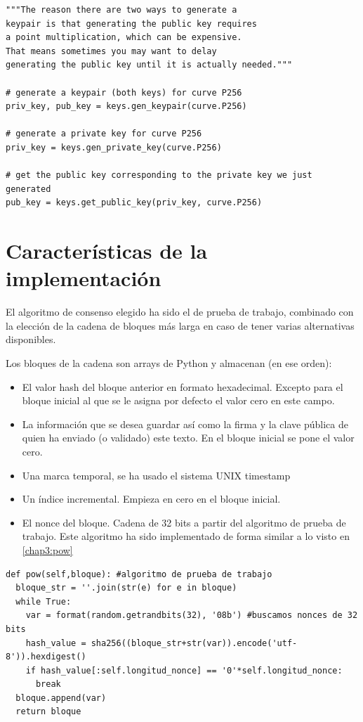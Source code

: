 \begin{itemize}
\begin{lstlisting}[title=Generación de claves]
"""The reason there are two ways to generate a 
keypair is that generating the public key requires
a point multiplication, which can be expensive. 
That means sometimes you may want to delay
generating the public key until it is actually needed."""

# generate a keypair (both keys) for curve P256
priv_key, pub_key = keys.gen_keypair(curve.P256)

# generate a private key for curve P256
priv_key = keys.gen_private_key(curve.P256)

# get the public key corresponding to the private key we just generated
pub_key = keys.get_public_key(priv_key, curve.P256)
\end{lstlisting}

\end{itemize}


\section{Características de la implementación}
El algoritmo de consenso elegido ha sido el de prueba de trabajo, combinado con la elección de la cadena de bloques más larga en caso de tener varias alternativas disponibles.

Los bloques de la cadena son arrays de Python y almacenan (en ese orden):
\begin{itemize}
\item El valor hash del bloque anterior en formato hexadecimal. Excepto para el bloque inicial al que se le asigna por defecto el valor cero en este campo.
\item La información que se desea guardar así como la firma y la clave pública de quien ha enviado (o validado) este texto. En el bloque inicial se pone el valor cero.
\item Una marca temporal, se ha usado el sistema UNIX timestamp
\item Un índice incremental. Empieza en cero en el bloque inicial.  
\item El nonce del bloque. Cadena de 32 bits a partir del algoritmo de prueba de trabajo. Este algoritmo ha sido implementado de forma similar a lo visto en \ref{chap3:pow}
\end{itemize}

\lstset{language=Python}
\lstset{frame=lines}
\lstset{basicstyle=\footnotesize}
\begin{lstlisting}[title=Algoritmo de prueba de trabajo]
def pow(self,bloque): #algoritmo de prueba de trabajo
  bloque_str = ''.join(str(e) for e in bloque)
  while True:
    var = format(random.getrandbits(32), '08b') #buscamos nonces de 32 bits
    hash_value = sha256((bloque_str+str(var)).encode('utf-8')).hexdigest()
    if hash_value[:self.longitud_nonce] == '0'*self.longitud_nonce:
      break
  bloque.append(var)
  return bloque
\end{lstlisting}


